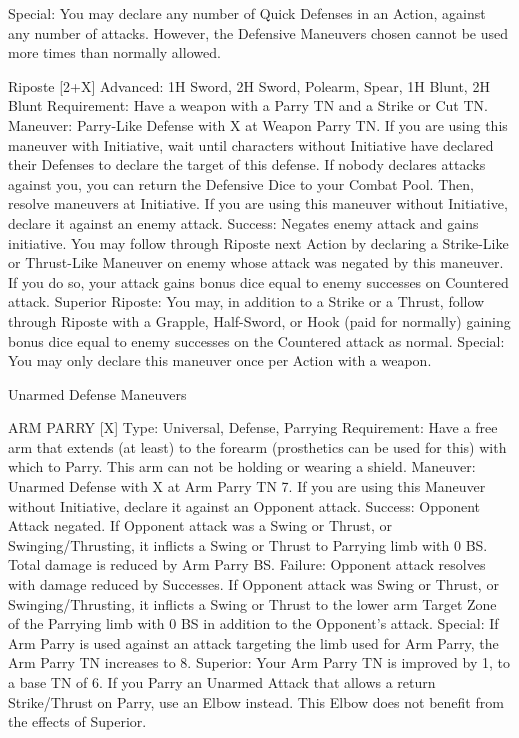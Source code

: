 \documentclass[oneside,11pt,english]{book}
\begin{document}
Special: You may declare any number of Quick Defenses in an Action, against any number of attacks. 
However, the Defensive Maneuvers chosen cannot be used more times than normally allowed. 

 

Riposte [2+X] 
Advanced: 1H Sword, 2H Sword, Polearm, Spear, 1H Blunt, 2H Blunt 
Requirement: Have a weapon with a Parry TN and a Strike or Cut TN. 
Maneuver: Parry-Like Defense with X at Weapon Parry TN. 
If you are using this maneuver with Initiative, wait until characters without Initiative have declared their 
Defenses to declare the target of this defense. If nobody declares attacks against you, you can return the 
Defensive Dice to your Combat Pool. Then, resolve maneuvers at Initiative. 
If you are using this maneuver without Initiative, declare it against an enemy attack. 
Success: Negates enemy attack and gains initiative. You may follow through Riposte next Action by 
declaring a Strike-Like or Thrust-Like Maneuver on enemy whose attack was negated by this maneuver. 
If you do so, your attack gains bonus dice equal to enemy successes on Countered attack. 
Superior Riposte: You may, in addition to a Strike or a Thrust, follow through Riposte with a Grapple, 
Half-Sword, or Hook (paid for normally) gaining bonus dice equal to enemy successes on the Countered 
attack as normal. 
Special: You may only declare this maneuver once per Action with a weapon. 

 

 

 

Unarmed Defense Maneuvers 

 

ARM PARRY [X] 
Type: Universal, Defense, Parrying 
Requirement: Have a free arm that extends (at least) to the forearm (prosthetics can be used for this) with 
which to Parry. This arm can not be holding or wearing a shield. 
Maneuver: Unarmed Defense with X at Arm Parry TN 7. If you are using this Maneuver without 
Initiative, declare it against an Opponent attack. 
Success: Opponent Attack negated. If Opponent attack was a Swing or Thrust, or Swinging/Thrusting, it 
inflicts a Swing or Thrust to Parrying limb with 0 BS. Total damage is reduced by Arm Parry BS. 
Failure: Opponent attack resolves with damage reduced by Successes. If Opponent attack was Swing or 
Thrust, or Swinging/Thrusting, it inflicts a Swing or Thrust to the lower arm Target Zone of the Parrying 
limb with 0 BS in addition to the Opponent’s attack. 
Special: If Arm Parry is used against an attack targeting the limb used for Arm Parry, the Arm Parry TN 
increases to 8. 
Superior: Your Arm Parry TN is improved by 1, to a base TN of 6. If you Parry an Unarmed Attack that 
allows a return Strike/Thrust on Parry, use an Elbow instead. This Elbow does not benefit from the effects 
of Superior. 
\end{document}
